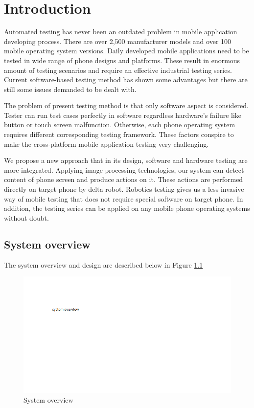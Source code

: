 \chapter{Introduction}

Automated testing has never been an outdated problem in mobile application developing process. There are over 2,500 manufacturer models and over 100 mobile operating system versions\cite{crittercism}. Daily developed mobile applications need to be tested in wide range of phone designs and platforms. These result in enormous amount of testing scenarios and require an effective industrial testing series. Current software-based testing method has shown some advantages but there are still some issues demanded to be dealt with.

The problem of present testing method is that only software aspect is considered. Tester can run test cases perfectly in software regardless hardware's failure like button or touch screen malfunction. Otherwise, each phone operating system requires different corresponding testing framework. These factors conspire to make the cross-platform mobile application testing very challenging. \nocite{weinman_thesis}

We propose a new approach that in its design, software and hardware testing are more integrated. Applying image processing technologies, our system can detect content of phone screen and produce actions on it. These actions are performed directly on target phone by delta robot. Robotics testing gives us a less invasive way of mobile testing that does not require special software on target phone. In addition, the testing series can be applied on any mobile phone operating systems without doubt.

\section{System overview}
The system overview and design are described below in Figure \ref{fig:sys_overview}
	\begin{figure}
		\vspace{-20pt} %
		\centering
		\includegraphics[scale=1]{Chapters/Fig/sys_overview.png}
		\caption{System overview}
		\label{fig:sys_overview}
	\end{figure}

